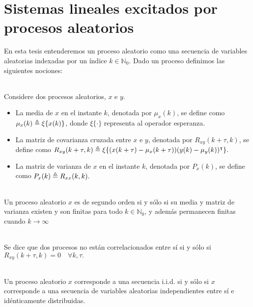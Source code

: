 \section{Sistemas lineales excitados por procesos aleatorios}\label{sec:aleatorios}
En esta tesis entenderemos un proceso aleatorio como una secuencia de variables aleatorias indexadas por un \'indice $k \in \mathbb{N}_0$. Dado un proceso definimos las siguientes nociones:

\begin{lema}\label{lema:momentos}{\ \\}
Considere dos procesos aleatorios, $x$ e $y$.
\begin{itemize}
\item La media de $x$ en el instante $k$, denotada por $\mu_x(k)$, se define como $\mu_x(k) \triangleq \xi\{x(k)\}$, donde $\xi\{\cdot\}$ representa al operador esperanza.
\item La matriz de covarianza cruzada entre $x$ e $y$, denotada por $R_{xy}(k+\tau,k)$, se define como $R_{xy}(k+\tau,k)\triangleq \xi\{ (x(k+\tau)-\mu_x(k+\tau))(y(k)-\mu_y(k))^{\intercal}\}.$
\item La matriz de varianza de $x$ en el instante $k$, denotada por $P_x(k)$, se define como $P_x(k)\triangleq R_{xx}(k,k).$
\end{itemize}\QED
\end{lema}

\begin{defin}{\ \\}
Un proceso aleatorio $x$ es de segundo orden si y s\'olo si su media y matriz de varianza existen y son finitas para todo $k \in \mathbb{N}_0$, y adem\'as permanecen finitas cuando $k\rightarrow \infty$
\end{defin}

\begin{defin}{\ \\}
Se dice que dos procesos no est\'an correlacionados entre s\'i si y s\'olo si $R_{xy}(k+\tau,k)=0 \quad \forall k,\tau.$
\end{defin}

\begin{defin}[Proceso i.i.d.]{\ \\}
Un proceso aleatorio $x$ corresponde a una secuencia i.i.d. si y s\'olo si $x$ corresponde a una secuencia de variables aleatorias independientes entre s\'i e id\'enticamente distribuidas.
\end{defin}

